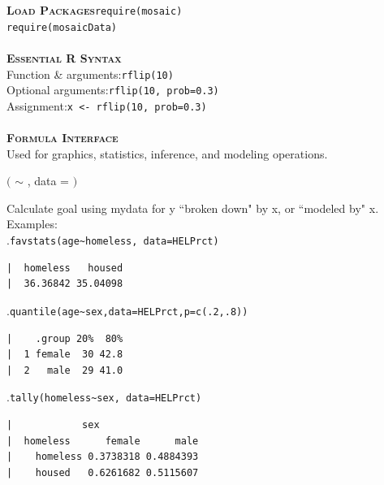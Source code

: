 \documentclass{article}\usepackage[]{graphicx}\usepackage[]{color}
\makeatletter
\newenvironment{kframe}{%
 \def\at@end@of@kframe{}%
 \ifinner\ifhmode%
  \def\at@end@of@kframe{\end{minipage}}%
  \begin{minipage}{\columnwidth}%
 \fi\fi%
 \def\FrameCommand##1{\hskip\@totalleftmargin \hskip-\fboxsep
 \colorbox{shadecolor}{##1}\hskip-\fboxsep
     \hskip-\linewidth \hskip-\@totalleftmargin \hskip\columnwidth}%
 \MakeFramed {\advance\hsize-\width
   \@totalleftmargin\z@ \linewidth\hsize
   \@setminipage}}%
 {\par\unskip\endMakeFramed%
 \at@end@of@kframe}
\newenvironment{knitrout}{}{} %
\newcommand{\Wspace}{{\tiny\color{white}.}\hfill}
\newcommand{\NewSection}[1]{{\noindent\color{blue}\bfseries\scshape#1}}
\makeatother
\begin{document}
\NewSection{Load Packages}\hfill\verb+require(mosaic)+\\ 
\hspace*{1cm}\hfill\verb+require(mosaicData)+\\
\\
\NewSection{Essential R Syntax}\\
Function \& arguments:\hfill \verb+rflip(10)+\\
Optional arguments:\hfill \verb+rflip(10, prob=0.3)+\\
Assignment:\hfill \verb+x <- rflip(10, prob=0.3)+\\
\\
\NewSection{Formula Interface}\\
Used for graphics, statistics, inference, and modeling operations.\\
\def\phbox#1{\fbox{\phantom{g#1l}}} %
\def\ffbox#1{\fbox{\phantom{g}#1\phantom{b}}} %
\vspace*{-.5cm}\begin{center}
	\sf
	\ffbox{goal} $\Big($ 
	\ffbox{y} $\sim$  \ffbox{x} {\LARGE,} data = \ffbox{mydata} $\Big)$
\end{center}
 {Calculate {\sf goal} using {\sf mydata} for {\sf y} ``broken down" by {\sf x}, or ``modeled by" {\sf x}.} Examples:\\
\Wspace\verb+favstats(age~homeless, data=HELPrct)+%
\vspace*{-2mm}
\begin{knitrout}
\color{fgcolor}\begin{kframe}
\begin{verbatim}
|  homeless   housed 
|  36.36842 35.04098
\end{verbatim}
\end{kframe}
\end{knitrout}
\Wspace\verb+quantile(age~sex,data=HELPrct,p=c(.2,.8))+%
\vspace*{-6mm}
\begin{knitrout}
\color{fgcolor}\begin{kframe}
\begin{verbatim}
|    .group 20%  80%
|  1 female  30 42.8
|  2   male  29 41.0
\end{verbatim}
\end{kframe}
\end{knitrout}
\Wspace\verb+tally(homeless~sex, data=HELPrct)+%
\vspace*{-2mm}
\begin{knitrout}
\color{fgcolor}\begin{kframe}
\begin{verbatim}
|            sex
|  homeless      female      male
|    homeless 0.3738318 0.4884393
|    housed   0.6261682 0.5115607
\end{verbatim}
\end{kframe}
\end{knitrout}
\end{document}
